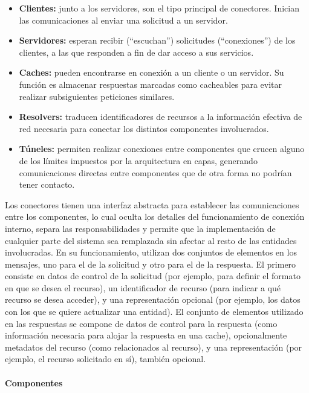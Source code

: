 \begin{itemize}
  \item \textbf{Clientes:} junto a los servidores, son el tipo principal de conectores. Inician las comunicaciones al enviar una solicitud a un servidor.

  \item \textbf{Servidores:} esperan recibir (``escuchan'') solicitudes (``conexiones'') de los clientes, a las que responden a fin de dar acceso a sus servicios.

  \item \textbf{Caches:} pueden encontrarse en conexión a un cliente o un servidor. Su función es almacenar respuestas marcadas como cacheables para evitar realizar subsiguientes peticiones similares.

  \item \textbf{Resolvers:} traducen identificadores de recursos a la información efectiva de red necesaria para conectar los distintos componentes involucrados.

  \item \textbf{Túneles:} permiten realizar conexiones entre componentes que crucen alguno de los límites impuestos por la arquitectura en capas, generando comunicaciones directas entre componentes que de otra forma no podrían tener contacto.
\end{itemize}

Los conectores tienen una interfaz abstracta para establecer las comunicaciones entre los componentes, lo cual oculta los detalles del funcionamiento de conexión interno, separa las responsabilidades y permite que la implementación de cualquier parte del sistema sea remplazada sin afectar al resto de las entidades involucradas. En su funcionamiento, utilizan dos conjuntos de elementos en los mensajes, uno para el de la solicitud y otro para el de la respuesta. El primero consiste en datos de control de la solicitud (por ejemplo, para definir el formato en que se desea el recurso), un identificador de recurso (para indicar a qué recurso se desea acceder), y una representación opcional (por ejemplo, los datos con los que se quiere actualizar una entidad). El conjunto de elementos utilizado en las respuestas se compone de datos de control para la respuesta (como información necesaria para alojar la respuesta en una cache), opcionalmente metadatos del recurso (como  relacionados al recurso), y una representación (por ejemplo, el recurso solicitado en sí), también opcional.


\paragraph{Componentes}

